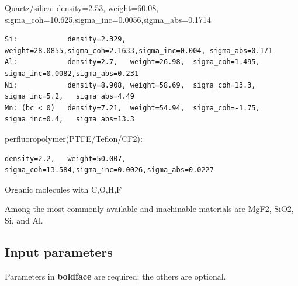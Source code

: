 Quartz/silica: density=2.53, weight=60.08, sigma\_coh=10.625,sigma\_inc=0.0056,sigma\_abs=0.1714

\begin{verbatim}
Si:            density=2.329, weight=28.0855,sigma_coh=2.1633,sigma_inc=0.004, sigma_abs=0.171
Al:            density=2.7,   weight=26.98,  sigma_coh=1.495, sigma_inc=0.0082,sigma_abs=0.231
Ni:            density=8.908, weight=58.69,  sigma_coh=13.3,  sigma_inc=5.2,   sigma_abs=4.49
Mn: (bc < 0)   density=7.21,  weight=54.94,  sigma_coh=-1.75, sigma_inc=0.4,   sigma_abs=13.3
\end{verbatim}

perfluoropolymer(PTFE/Teflon/CF2):

\begin{verbatim}
density=2.2,   weight=50.007, sigma_coh=13.584,sigma_inc=0.0026,sigma_abs=0.0227
\end{verbatim}

Organic molecules with C,O,H,F

Among the most commonly available and machinable materials are MgF2, SiO2, Si, and Al.

\subsection*{Input parameters}
Parameters in \textbf{boldface} are required; the others are optional.

